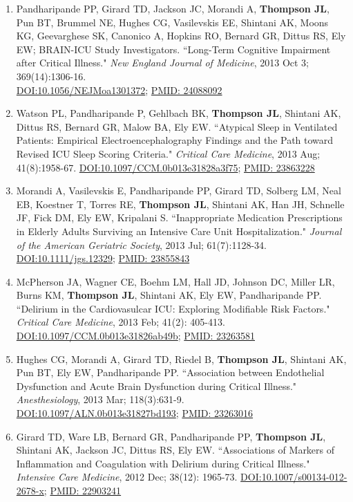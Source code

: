\documentclass[5pt]{article}
\begin{document}
\begin{enumerate}
\item Pandharipande PP, Girard TD, Jackson JC, Morandi A, \textbf{Thompson JL}, Pun BT, Brummel NE, Hughes CG, Vasilevskis EE, Shintani AK, Moons KG, Geevarghese SK, Canonico A, Hopkins RO, Bernard GR, Dittus RS, Ely EW; BRAIN-ICU Study Investigators. ``Long-Term Cognitive Impairment after Critical Illness." \emph{New England Journal of Medicine}, 2013 Oct 3; 369(14):1306-16.\\ \href{https://doi.org/10.1056/NEJMoa1301372}{DOI:10.1056/NEJMoa1301372}; \href{https://www.ncbi.nlm.nih.gov/pubmed/24088092}{PMID: 24088092}
\item Watson PL, Pandharipande P, Gehlbach BK, \textbf{Thompson JL}, Shintani AK, Dittus RS, Bernard GR, Malow BA, Ely EW. ``Atypical Sleep in Ventilated Patients: Empirical Electroencephalography Findings and the Path toward Revised ICU Sleep Scoring Criteria." \emph{Critical Care Medicine}, 2013 Aug; 41(8):1958-67. \href{https://doi.org/10.1097/CCM.0b013e31828a3f75}{DOI:10.1097/CCM.0b013e31828a3f75}; \href{https://www.ncbi.nlm.nih.gov/pubmed/23863228}{PMID: 23863228}
\item Morandi A, Vasilevskis E, Pandharipande PP, Girard TD, Solberg LM, Neal EB, Koestner T, Torres RE, \textbf{Thompson JL}, Shintani AK, Han JH, Schnelle JF, Fick DM, Ely EW, Kripalani S. ``Inappropriate Medication Prescriptions in Elderly Adults Surviving an Intensive Care Unit Hospitalization." \emph{Journal of the American Geriatric Society}, 2013 Jul; 61(7):1128-34. \href{https://doi.org/10.1111/jgs.12329}{DOI:10.1111/jgs.12329}; \href{https://www.ncbi.nlm.nih.gov/pubmed/23855843}{PMID: 23855843}
\item McPherson JA, Wagner CE, Boehm LM, Hall JD, Johnson DC, Miller LR, Burns KM, \textbf{Thompson JL}, Shintani AK, Ely EW, Pandharipande PP. ``Delirium in the Cardiovasulcar ICU: Exploring Modifiable Risk Factors." \emph{Critical Care Medicine}, 2013 Feb; 41(2): 405-413. \href{https://doi.org/10.1097/CCM.0b013e31826ab49b}{DOI:10.1097/CCM.0b013e31826ab49b}; \href{https://www.ncbi.nlm.nih.gov/pubmed/23263581}{PMID: 23263581}
\item Hughes CG, Morandi A, Girard TD, Riedel B, \textbf{Thompson JL}, Shintani AK, Pun BT, Ely EW, Pandharipande PP. ``Association between Endothelial Dysfunction and Acute Brain Dysfunction during Critical Illness." \emph{Anesthesiology}, 2013 Mar; 118(3):631-9. \href{https://doi.org/10.1097/ALN.0b013e31827bd193}{DOI:10.1097/ALN.0b013e31827bd193}; \href{https://www.ncbi.nlm.nih.gov/pubmed/23263016}{PMID: 23263016}
\item Girard TD, Ware LB, Bernard GR, Pandharipande PP, \textbf{Thompson JL}, Shintani AK, Jackson JC, Dittus RS, Ely EW. ``Associations of Markers of Inflammation and Coagulation with Delirium during Critical Illness." \emph{Intensive Care Medicine}, 2012 Dec; 38(12): 1965-73. \href{https://doi.org/10.1007/s00134-012-2678-x}{DOI:10.1007/s00134-012-2678-x}; \href{https://www.ncbi.nlm.nih.gov/pubmed/22903241}{PMID: 22903241}

\end{enumerate}
\end{document}
